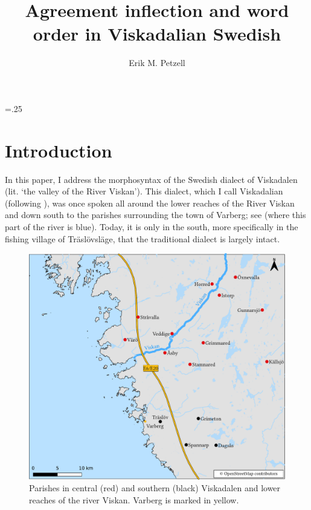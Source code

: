 \documentclass[output=paper,colorlinks,citecolor=brown,draft,draftmode]{langscibook}
\author{Erik M. Petzell\orcid{}\affiliation{Institute for Language and Folklore, Gothenburg}}
\title{Agreement inflection and word order in Viskadalian Swedish}
\begin{document}
\multicolsep=.25\baselineskip
\maketitle


\section{Introduction}\label{sec:petzell:1}


In this paper, I address the morphosyntax of the Swedish dialect of Viskadalen (lit. ‘the valley of the River Viskan’). This dialect, which I call Viskadalian (following \citealt{Petzell2017}), was once spoken all around the lower reaches of the River Viskan and down south to the parishes surrounding the town of Varberg; see  (where this part of the river is blue). Today, it is only in the south, more specifically in the fishing village of Träslövsläge, that the traditional dialect is largely intact. 

\begin{figure}
\includegraphics[width=\textwidth]{figures/lmswe-latest-compressed.pdf}
\caption{\label{figmap:petzell:1}\label{figmap:petzell:2}Parishes in central (red) and southern (black) Viskadalen and lower reaches of the river Viskan. Varberg is marked in yellow.}
\end{figure}
\end{document}

